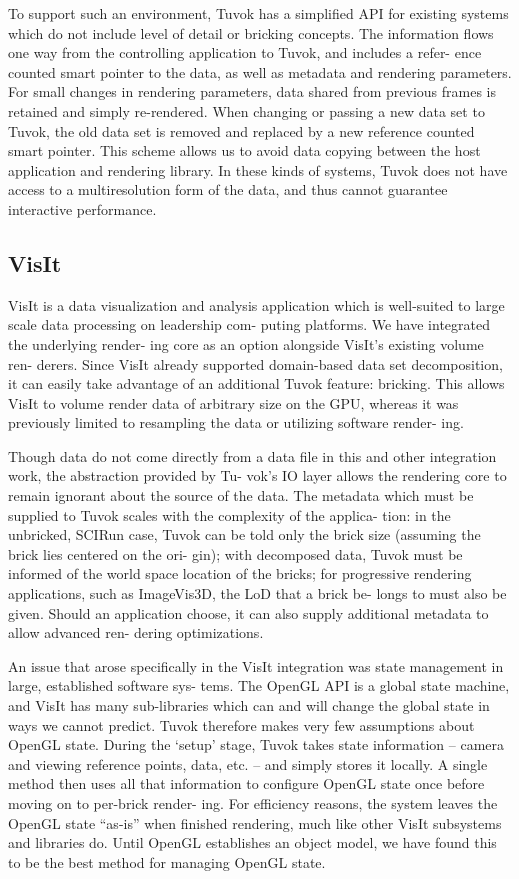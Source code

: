 To support such an environment, Tuvok has a simplified
API for existing systems which do not include level of detail
or bricking concepts. The information flows one way from
the controlling application to Tuvok, and includes a refer-
ence counted smart pointer to the data, as well as metadata
and rendering parameters. For small changes in rendering
parameters, data shared from previous frames is retained and
simply re-rendered. When changing or passing a new data
set to Tuvok, the old data set is removed and replaced by
a new reference counted smart pointer. This scheme allows
us to avoid data copying between the host application and
rendering library. In these kinds of systems, Tuvok does not
have access to a multiresolution form of the data, and thus
cannot guarantee interactive performance.

\subsection{VisIt}

VisIt is a data visualization and analysis application which is
well-suited to large scale data processing on leadership com-
puting platforms. We have integrated the underlying render-
ing core as an option alongside VisIt’s existing volume ren-
derers. Since VisIt already supported domain-based data set
decomposition, it can easily take advantage of an additional
Tuvok feature: bricking. This allows VisIt to volume render
data of arbitrary size on the GPU, whereas it was previously
limited to resampling the data or utilizing software render-
ing.

Though data do not come directly from a data file in this
and other integration work, the abstraction provided by Tu-
vok’s IO layer allows the rendering core to remain ignorant
about the source of the data. The metadata which must be
supplied to Tuvok scales with the complexity of the applica-
tion: in the unbricked, SCIRun case, Tuvok can be told only
the brick size (assuming the brick lies centered on the ori-
gin); with decomposed data, Tuvok must be informed of the
world space location of the bricks; for progressive rendering
applications, such as ImageVis3D, the LoD that a brick be-
longs to must also be given. Should an application choose, it
can also supply additional metadata to allow advanced ren-
dering optimizations.

An issue that arose specifically in the VisIt integration
was state management in large, established software sys-
tems. The OpenGL API is a global state machine, and VisIt
has many sub-libraries which can and will change the global
state in ways we cannot predict. Tuvok therefore makes very
few assumptions about OpenGL state. During the ‘setup’
stage, Tuvok takes state information – camera and viewing
reference points, data, etc. – and simply stores it locally.
A single method then uses all that information to configure
OpenGL state once before moving on to per-brick render-
ing. For efficiency reasons, the system leaves the OpenGL
state “as-is” when finished rendering, much like other VisIt
subsystems and libraries do. Until OpenGL establishes an
object model, we have found this to be the best method for
managing OpenGL state.

